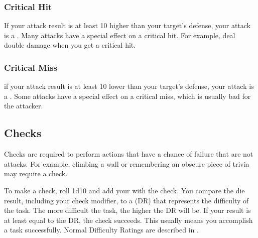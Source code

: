         \subsubsection{Critical Hit}
            If your attack result is at least 10 higher than your target's defense, your attack is a .
            Many attacks have a special effect on a critical hit.
            For example,  deal double damage when you get a critical hit.

        \subsubsection{Critical Miss}
            if your attack result is at least 10 lower than your target's defense, your attack is a .
            Some attacks have a special effect on a critical miss, which is usually bad for the attacker.

    \subsection{Checks}
        Checks are required to perform actions that have a chance of failure that are not attacks.
        For example, climbing a wall or remembering an obscure piece of trivia may require a check.

        To make a check, roll 1d10 and add your  with the check.
        You compare the die result, including your check modifier, to a  (DR) that represents the difficulty of the task.
        The more difficult the task, the higher the DR will be.
        If your result is at least equal to the DR, the check succeeds.
        This usually means you accomplish a task successfully.
        Normal Difficulty Ratings are described in .

